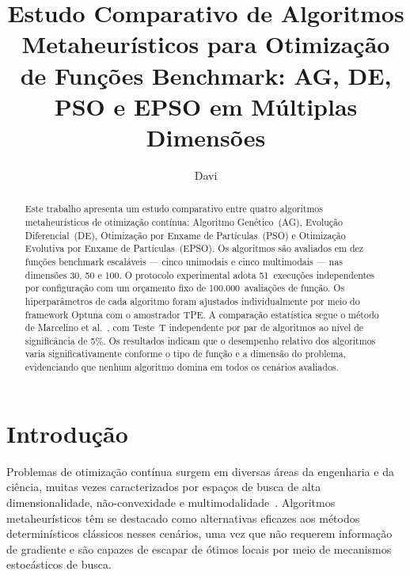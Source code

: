 \documentclass[runningheads]{llncs}
\begin{document}
\title{Estudo Comparativo de Algoritmos Metaheurísticos para
Otimização de Fun\c{c}\~{o}es Benchmark: AG, DE, PSO e EPSO
em M\'{u}ltiplas Dimens\~{o}es}


\author{Davi}


\maketitle

\begin{abstract}
Este trabalho apresenta um estudo comparativo entre quatro algoritmos
metaheurísticos de otimização contínua: Algoritmo Genético~(AG),
Evolução Diferencial~(DE), Otimização por Enxame de Partículas~(PSO)
e Otimização Evolutiva por Enxame de Partículas~(EPSO). Os algoritmos
são avaliados em dez funções benchmark escaláveis — cinco unimodais e
cinco multimodais — nas dimensões 30, 50 e 100. O protocolo experimental
adota 51~execuções independentes por configuração com um orçamento fixo
de 100.000~avaliações de função. Os hiperparâmetros de cada algoritmo
foram ajustados individualmente por meio do framework Optuna com o
amostrador TPE\@. A comparação estatística segue o método de Marcelino
et al.~\cite{marcelino2018}, com Teste~T independente por par de
algoritmos ao nível de significância de 5\%. Os resultados indicam que
o desempenho relativo dos algoritmos varia significativamente conforme
o tipo de função e a dimensão do problema, evidenciando que nenhum
algoritmo domina em todos os cenários avaliados.

\end{abstract}

\section{Introdução}
\label{sec:intro}

Problemas de otimização contínua surgem em diversas áreas da engenharia
e da ciência, muitas vezes caracterizados por espaços de busca de alta
dimensionalidade, não-convexidade e multimodalidade~\cite{storn1997}.
Algoritmos metaheurísticos têm se destacado como alternativas eficazes
aos métodos determinísticos clássicos nesses cenários, uma vez que não
requerem informação de gradiente e são capazes de escapar de ótimos
locais por meio de mecanismos estocásticos de busca.
\end{document}
